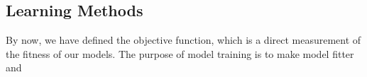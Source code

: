 \subsection {Learning Methods}
By now, we have defined the objective function, which is a direct measurement of the fitness of our models. The purpose of model training is to make model fitter and 